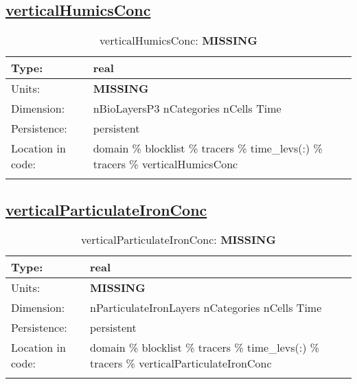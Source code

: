 \subsection[verticalHumicsConc]{\hyperref[sec:var_tab_tracers]{verticalHumicsConc}}
\label{subsec:var_sec_tracers_verticalHumicsConc}
\begin{center}
\begin{longtable}{| p{2.0in} | p{4.0in} |}
        \hline 
        Type: & real \\
        \hline 
        Units: & {\bf \color{red} MISSING} \\
        \hline 
        Dimension: & nBioLayersP3 nCategories nCells Time \\
        \hline 
        Persistence: & persistent \\
        \hline 
         Location in code: & domain \% blocklist \% tracers \% time\_levs(:) \% tracers \% verticalHumicsConc \\
         \hline 
    \caption{verticalHumicsConc: {\bf \color{red} MISSING}}
\end{longtable}
\end{center}
\subsection[verticalParticulateIronConc]{\hyperref[sec:var_tab_tracers]{verticalParticulateIronConc}}
\label{subsec:var_sec_tracers_verticalParticulateIronConc}
\begin{center}
\begin{longtable}{| p{2.0in} | p{4.0in} |}
        \hline 
        Type: & real \\
        \hline 
        Units: & {\bf \color{red} MISSING} \\
        \hline 
        Dimension: & nParticulateIronLayers nCategories nCells Time \\
        \hline 
        Persistence: & persistent \\
        \hline 
         Location in code: & domain \% blocklist \% tracers \% time\_levs(:) \% tracers \% verticalParticulateIronConc \\
         \hline 
    \caption{verticalParticulateIronConc: {\bf \color{red} MISSING}}
\end{longtable}
\end{center}
